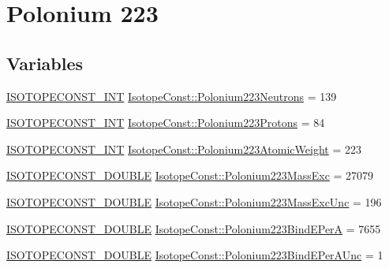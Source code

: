 \hypertarget{group___isotope_const-_polonium-_po223}{}\section{Polonium 223}
\label{group___isotope_const-_polonium-_po223}
\subsection*{Variables}
\begin{DoxyCompactItemize}
\item 
\mbox{\hyperlink{group___isotope_const-_macros_ga5f18360b3e99483a35c32d789e62621c}{I\+S\+O\+T\+O\+P\+E\+C\+O\+N\+S\+T\+\_\+\+I\+NT}} \mbox{\hyperlink{group___isotope_const-_polonium-_po223_ga176fa8287791ac82fc8f0f53e70b808f}{Isotope\+Const\+::\+Polonium223\+Neutrons}} = 139
\item 
\mbox{\hyperlink{group___isotope_const-_macros_ga5f18360b3e99483a35c32d789e62621c}{I\+S\+O\+T\+O\+P\+E\+C\+O\+N\+S\+T\+\_\+\+I\+NT}} \mbox{\hyperlink{group___isotope_const-_polonium-_po223_ga0f21afcf499ab4fa94fd8cbc5697de4d}{Isotope\+Const\+::\+Polonium223\+Protons}} = 84
\item 
\mbox{\hyperlink{group___isotope_const-_macros_ga5f18360b3e99483a35c32d789e62621c}{I\+S\+O\+T\+O\+P\+E\+C\+O\+N\+S\+T\+\_\+\+I\+NT}} \mbox{\hyperlink{group___isotope_const-_polonium-_po223_gaeb4397bdc61fd7dc8ca29ec0ee6db1eb}{Isotope\+Const\+::\+Polonium223\+Atomic\+Weight}} = 223
\item 
\mbox{\hyperlink{group___isotope_const-_macros_ga8f45a7272ce02c0b4c65c44636ed719a}{I\+S\+O\+T\+O\+P\+E\+C\+O\+N\+S\+T\+\_\+\+D\+O\+U\+B\+LE}} \mbox{\hyperlink{group___isotope_const-_polonium-_po223_ga9a5947cd29c30b5c4a861896fd5af923}{Isotope\+Const\+::\+Polonium223\+Mass\+Exc}} = 27079
\item 
\mbox{\hyperlink{group___isotope_const-_macros_ga8f45a7272ce02c0b4c65c44636ed719a}{I\+S\+O\+T\+O\+P\+E\+C\+O\+N\+S\+T\+\_\+\+D\+O\+U\+B\+LE}} \mbox{\hyperlink{group___isotope_const-_polonium-_po223_ga7899df31a8ef10cb07189a1fb41d9b52}{Isotope\+Const\+::\+Polonium223\+Mass\+Exc\+Unc}} = 196
\item 
\mbox{\hyperlink{group___isotope_const-_macros_ga8f45a7272ce02c0b4c65c44636ed719a}{I\+S\+O\+T\+O\+P\+E\+C\+O\+N\+S\+T\+\_\+\+D\+O\+U\+B\+LE}} \mbox{\hyperlink{group___isotope_const-_polonium-_po223_ga71487834e6958ea51103f31c39f93142}{Isotope\+Const\+::\+Polonium223\+Bind\+E\+PerA}} = 7655
\item 
\mbox{\hyperlink{group___isotope_const-_macros_ga8f45a7272ce02c0b4c65c44636ed719a}{I\+S\+O\+T\+O\+P\+E\+C\+O\+N\+S\+T\+\_\+\+D\+O\+U\+B\+LE}} \mbox{\hyperlink{group___isotope_const-_polonium-_po223_ga4973ffe07b9b216ec2351d7a58136284}{Isotope\+Const\+::\+Polonium223\+Bind\+E\+Per\+A\+Unc}} = 1

\end{DoxyCompactItemize}
